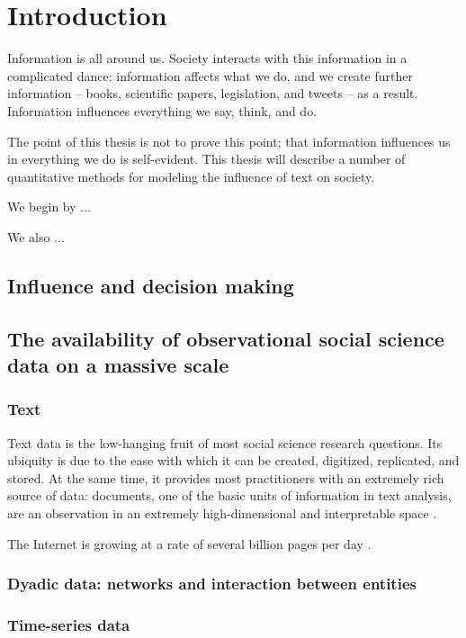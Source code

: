 \chapter{Introduction}


Information is all around us.  Society interacts with this information
in a complicated dance: information affects what we do, and we create
further information -- books, scientific papers, legislation, and
tweets -- as a result.  Information influences everything we say,
think, and do.

The point of this thesis is not to prove this point; that information
influences us in everything we do is self-evident.  This thesis will
describe a number of quantitative methods for modeling the influence of text on society.

We begin by ...

We also ...

\section{Influence and decision making}

\section{The availability of observational social science data on a massive scale}

\subsection{Text}
  Text data is the low-hanging fruit of most social science research
  questions.  Its ubiquity is due to the ease with which it can be
  created, digitized, replicated, and stored.  At the same time, it
  provides most practitioners with an extremely rich source of data:
  documents, one of the basic units of information in text analysis,
  are an observation in an extremely high-dimensional and
  interpretable space \cite{changrtl:2009}.

  The Internet is growing at a rate
  of several billion pages per day \cite{googleblog:2008}.

\subsection{Dyadic data: networks and interaction between entities}

\subsection{Time-series data}

